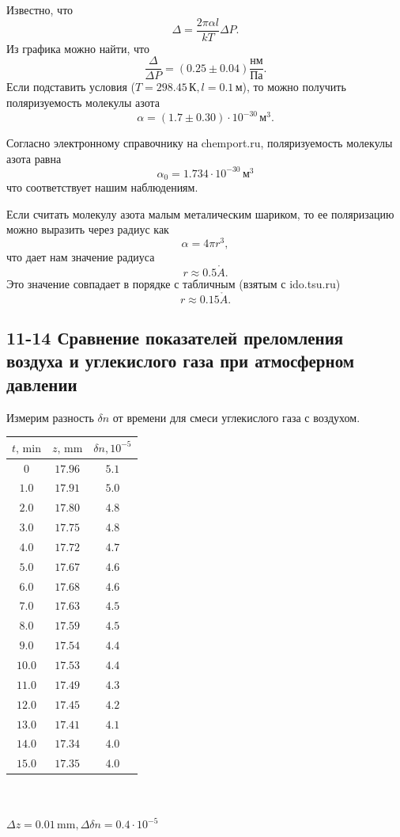 \documentclass[a4paper,12pt]{article}
\renewcommand{\AA}{\ensuremath{\mathring{A}}}
\begin{document}
Известно, что
\[\Delta = \frac{2\pi\alpha l}{kT}\Delta P.\]
Из графика можно найти, что
\[\frac{\Delta}{\Delta P} = (0.25 \pm 0.04)\frac{\text{нм}}{\text{Па}}.\]
Если подставить условия ($T=298.45\,\text{К}, l=0.1\,\text{м}$), то можно получить поляризуемость молекулы азота
\[\alpha = (1.7\pm0.30) \cdot 10^{-30}\,\text{м}^3.\]

Согласно электронному справочнику на chemport.ru, поляризуемость молекулы азота равна
\[\alpha_0 = 1.734 \cdot 10^{-30}\,\text{м}^3\]
что соответствует нашим наблюдениям.

Если считать молекулу азота малым металическим шариком, то ее поляризацию можно выразить через радиус как
\[\alpha = 4 \pi r^3,\]
что дает нам значение радиуса
\[r \approx 0.5 \AA.\]
Это значение совпадает в порядке с табличным (взятым с ido.tsu.ru)
\[r \approx 0.15 \AA.\]
\subsection{11-14 Сравнение показателей преломления воздуха и углекислого газа при атмосферном давлении}

Измерим разность $\delta n$ от времени для смеси углекислого газа с воздухом.

\begin{center}
\begin{tabular}{|c|c|c|}\hline
$t\text{, min}$&$z\text{, mm}$&$\delta n, 10^{-5}$\\\hline
$0$&$17.96$&$5.1$\\\hline
$1.0$&$17.91$&$5.0$\\\hline
$2.0$&$17.80$&$4.8$\\\hline
$3.0$&$17.75$&$4.8$\\\hline
$4.0$&$17.72$&$4.7$\\\hline
$5.0$&$17.67$&$4.6$\\\hline
$6.0$&$17.68$&$4.6$\\\hline
$7.0$&$17.63$&$4.5$\\\hline
$8.0$&$17.59$&$4.5$\\\hline
$9.0$&$17.54$&$4.4$\\\hline
$10.0$&$17.53$&$4.4$\\\hline
$11.0$&$17.49$&$4.3$\\\hline
$12.0$&$17.45$&$4.2$\\\hline
$13.0$&$17.41$&$4.1$\\\hline
$14.0$&$17.34$&$4.0$\\\hline
$15.0$&$17.35$&$4.0$\\\hline
\end{tabular}\\~\\
$\Delta z=0.01\,\text{mm}, \Delta \delta n=0.4\cdot10^{-5}$
\end{center}
\end{document}
